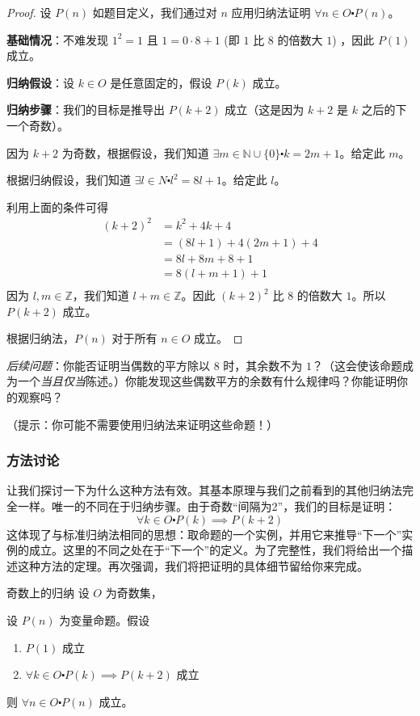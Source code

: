 \begin{proof}
    设 $P(n)$ 如题目定义，我们通过对 $n$ 应用归纳法证明 $\forall n \in O \centerdot P(n)$。

    \textbf{基础情况}：不难发现 $1^2=1$ 且 $1=0 \cdot 8 + 1$ (即 $1$ 比 $8$ 的倍数大 $1$) ，因此 $P(1)$ 成立。

    \textbf{归纳假设}：设 $k \in O$ 是任意固定的，假设 $P(k)$ 成立。

    \textbf{归纳步骤}：我们的目标是推导出 $P(k+2)$ 成立（这是因为 $k+2$ 是 $k$ 之后的下一个奇数）。

    因为 $k+2$ 为奇数，根据假设，我们知道 $\exists m \in \mathbb{N} \cup \{0\} \centerdot k = 2m+1$。给定此 $m$。

    根据归纳假设，我们知道 $\exists l \in N \centerdot l^2=8l+1$。给定此 $l$。

    利用上面的条件可得
    \begin{align*}
        (k + 2)^2 &= k^2 + 4k + 4 \\
        &= (8l + 1) + 4(2m + 1) + 4 \\
        &= 8l + 8m + 8 + 1 \\
        &= 8(l + m + 1) + 1 \\
    \end{align*}
    因为 $l, m \in \mathbb{Z}$，我们知道 $l+m \in \mathbb{Z}$。因此 $(k+2)^2$ 比 $8$ 的倍数大 $1$。所以 $P(k + 2)$ 成立。

    根据归纳法，$P(n)$ 对于所有 $n \in O$ 成立。
\end{proof}

\emph{后续问题}：你能否证明当偶数的平方除以 $8$ 时，其余数不为 $1$？（这会使该命题成为一个\emph{当且仅当}陈述。）你能发现这些偶数平方的余数有什么规律吗？你能证明你的观察吗？

（提示：你可能不需要使用归纳法来证明这些命题！）

\subsubsection*{方法讨论}

让我们探讨一下为什么这种方法有效。其基本原理与我们之前看到的其他归纳法完全一样。唯一的不同在于归纳步骤。由于奇数``间隔为2''，我们的目标是证明：
\[\forall k \in O \centerdot P(k) \implies P(k + 2)\]
这体现了与标准归纳法相同的思想：取命题的一个实例，并用它来推导``下一个''实例的成立。这里的不同之处在于``下一个''的定义。为了完整性，我们将给出一个描述这种方法的定理。再次强调，我们将把证明的具体细节留给你来完成。

\begin{theorem}{奇数上的归纳}\label{theorem5.3.5}
    设 $O$ 为奇数集，

    设 $P(n)$ 为变量命题。假设

    \begin{enumerate}[label=(\arabic*)]
        \item $P(1)$ 成立
        \item $\forall k \in O \centerdot P(k) \implies P(k + 2)$ 成立
    \end{enumerate}

    则 $\forall n \in O \centerdot P(n)$ 成立。
\end{theorem}

